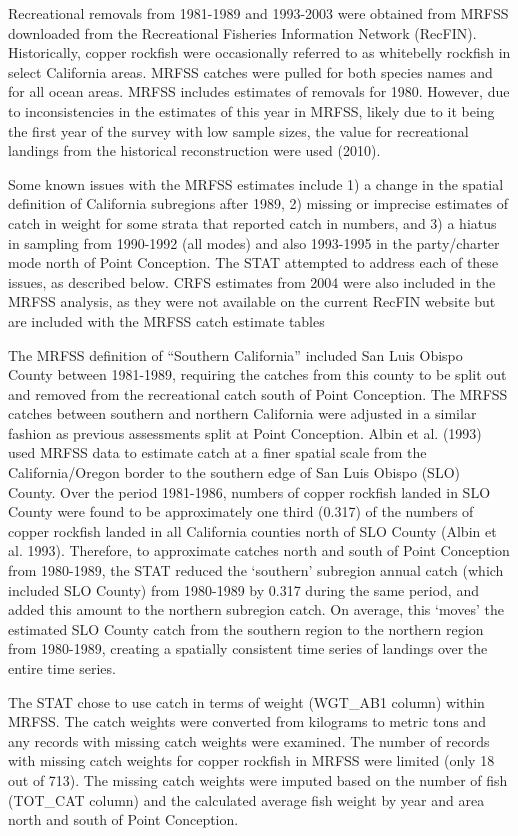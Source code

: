 \documentclass[11pt,
  english,
  letterpaper,
]{article}
\begin{document}
Recreational removals from 1981-1989 and 1993-2003 were obtained from MRFSS downloaded from the Recreational Fisheries Information Network (RecFIN). Historically, copper rockfish were occasionally referred to as whitebelly rockfish in select California areas. MRFSS catches were pulled for both species names and for all ocean areas. MRFSS includes estimates of removals for 1980. However, due to inconsistencies in the estimates of this year in MRFSS, likely due to it being the first year of the survey with low sample sizes, the value for recreational landings from the historical reconstruction were used (2010).

Some known issues with the MRFSS estimates include 1) a change in the spatial definition of California subregions after 1989, 2) missing or imprecise estimates of catch in weight for some strata that reported catch in numbers, and 3) a hiatus in sampling from 1990-1992 (all modes) and also 1993-1995 in the party/charter mode north of Point Conception. The STAT attempted to address each of these issues, as described below. CRFS estimates from 2004 were also included in the MRFSS analysis, as they were not available on the current RecFIN website but are included with the MRFSS catch estimate tables

The MRFSS definition of ``Southern California'' included San Luis Obispo County between 1981-1989, requiring the catches from this county to be split out and removed from the recreational catch south of Point Conception. The MRFSS catches between southern and northern California were adjusted in a similar fashion as previous assessments split at Point Conception. Albin et al. (1993) used MRFSS data to estimate catch at a finer spatial scale from the California/Oregon border to the southern edge of San Luis Obispo (SLO) County. Over the period 1981-1986, numbers of copper rockfish landed in SLO County were found to be approximately one third (0.317) of the numbers of copper rockfish landed in all California counties north of SLO County (Albin et al. 1993). Therefore, to approximate catches north and south of Point Conception from 1980-1989, the STAT reduced the `southern' subregion annual catch (which included SLO County) from 1980-1989 by 0.317 during the same period, and added this amount to the northern subregion catch. On average, this `moves' the estimated SLO County catch from the southern region to the northern region from 1980-1989, creating a spatially consistent time series of landings over the entire time series.

The STAT chose to use catch in terms of weight (WGT\_AB1 column) within MRFSS. The catch weights were converted from kilograms to metric tons and any records with missing catch weights were examined. The number of records with missing catch weights for copper rockfish in MRFSS were limited (only 18 out of 713). The missing catch weights were imputed based on the number of fish (TOT\_CAT column) and the calculated average fish weight by year and area north and south of Point Conception.
\end{document}
